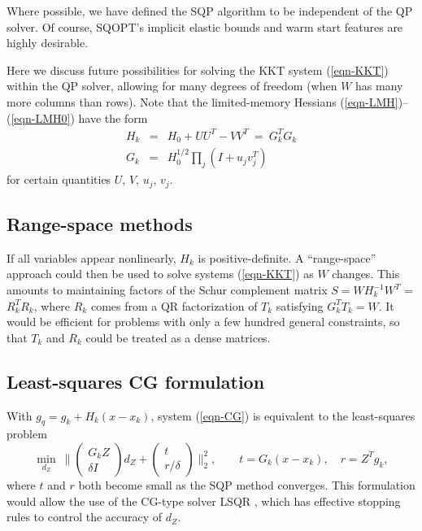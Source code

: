 \documentclass[draft,leqno,onefignum,onetabnum]{siamltex}
\newcommand{\normm}[1]{\biggl\|#1\biggr\|}
\def\T{^T\!}
\def\inv{^{-1}}
\def\Z{_{\scriptscriptstyle Z}}
\def\LSQR  {{\small LSQR}}
\def\LSSOL {{\small LSSOL}}
\def\NPSOL {{\small NPSOL}}
\def\QPOPT {{\small QPOPT}}
\def\SNOPT {{\small SNOPT}}
\def\SQOPT {{\small SQOPT}}
\newcommand{\pmat}[1]{\begin{pmatrix}#1\end{pmatrix}}
\begin{document}
Where possible, we have defined the SQP algorithm to be independent of
the QP solver.  Of course, \SQOPT's implicit elastic bounds and warm
start features are highly desirable.



Here we discuss future possibilities for solving the KKT system
(\ref{eqn-KKT}) within the QP solver, allowing for many degrees of
freedom (when $W$ has many more columns than rows).
Note that the limited-memory Hessians (\ref{eqn-LMH})--(\ref{eqn-LMH0})
have the form
\begin{eqnarray}
   H_k &=& H_0 + UU\T - VV\T \ =\ G_k\T G_k              \label{eqn-Hk}
\\ G_k &=& H_0^{1/2} \textstyle{\prod_j} (I + u_j v_j^T) \label{eqn-Gk}
\end{eqnarray}
for certain quantities $U$, $V$, $u_j$, $v_j$.


\subsection{Range-space methods} \label{sec-RS}

If all variables appear nonlinearly, $H_k$ is positive-definite.
A ``range-space'' approach could then be used to solve
systems (\ref{eqn-KKT}) as $W$ changes.  This amounts to
maintaining factors of the Schur complement matrix
$S = W H_k\inv W\T$ = $R_k\T R_k$, where $R_k$ comes from a
QR factorization of $T_k$ satisfying $G_k^T T_k = W$.
It would be efficient for problems with only a few hundred
general constraints, so that $T_k$ and $R_k$ could be treated
as a dense matrices.


\subsection{Least-squares CG formulation} \label{sec-LSQR}

With $g_q = g_k + H_k(x - x_k)$,
system (\ref{eqn-CG}) is equivalent to the least-squares problem
\begin{equation}
   \min_{d\Z}
   \ \normm{ \pmat{G_k Z \\ \delta I}d\Z + \pmat{t \\ r/\delta} }_2^2,
   \qquad t = G_k(x-x_k), \quad r = Z\T g_k,
\end{equation}
where $t$ and $r$ both become small as the SQP method converges.
This formulation would allow the use of the CG-type solver \LSQR{} \cite{PaiS82a},
which has effective stopping rules to control the accuracy of $d\Z$.
\end{document}
